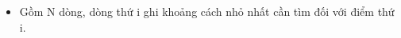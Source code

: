 \begin{itemize}
	\item Gồm N dòng, dòng thứ i ghi khoảng cách nhỏ nhất cần tìm đối với điểm thứ i.
\end{itemize}

\